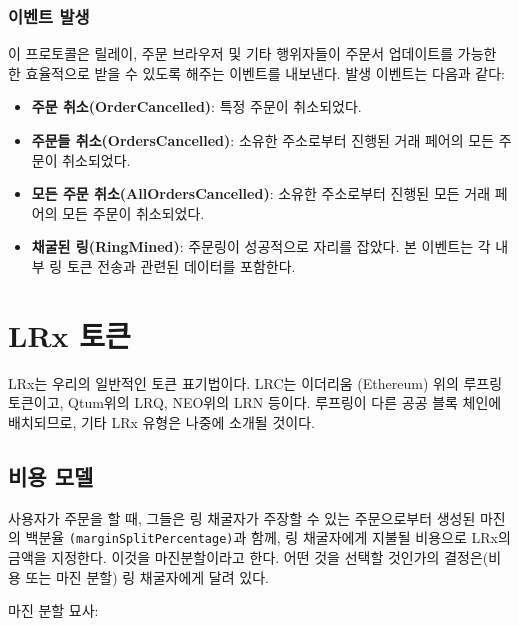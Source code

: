 \documentclass{article}
\makeatletter
\newenvironment{figurehere}
{\def\@captype{figure}}
{}
\makeatother
\begin{document}
\begin{multicols}{2}
\subsubsection{이벤트 발생\label{sec:events}}

이 프로토콜은 릴레이, 주문 브라우저 및 기타 행위자들이 주문서 업데이트를 가능한 한 효율적으로 받을 수 있도록 해주는 이벤트를 내보낸다. 발생 이벤트는 다음과 같다:

\begin{itemize}
	\item \textbf{주문 취소(OrderCancelled)}: 특정 주문이 취소되었다.
	\item \textbf{주문들 취소(OrdersCancelled)}: 소유한 주소로부터 진행된 거래 페어의 모든 주문이 취소되었다.
	\item \textbf{모든 주문 취소(AllOrdersCancelled)}: 소유한 주소로부터 진행된 모든 거래 페어의 모든 주문이 취소되었다.
	\item \textbf{채굴된 링(RingMined)}: 주문링이 성공적으로 자리를 잡았다. 본 이벤트는 각 내부 링 토큰 전송과 관련된 데이터를 포함한다.
\end{itemize}



\section{LRx 토큰\label{sec:token}}

LRx는 우리의 일반적인 토큰 표기법이다. LRC는 이더리움 (Ethereum) 위의 루프링 토큰이고, Qtum위의 LRQ, NEO위의 LRN 등이다. 루프링이 다른 공공 블록 체인에 배치되므로, 기타 LRx 유형은 나중에 소개될 것이다.

\subsection{비용 모델\label{sec:fee_model}}
사용자가 주문을 할 때, 그들은 링 채굴자가 주장할 수 있는 주문으로부터 생성된 마진의 백분율 \verb|(marginSplitPercentage)|과 함께, 링 채굴자에게 지불될 비용으로 LRx의 금액을 지정한다. 이것을 마진분할이라고 한다. 어떤 것을 선택할 것인가의 결정은(비용 또는 마진 분할) 링 채굴자에게 달려 있다. 

마진 분할 묘사:

\begin{center}
	\begin{figurehere}
		\centering
\end{figurehere}
\end{center}
\end{multicols}
\end{document}
